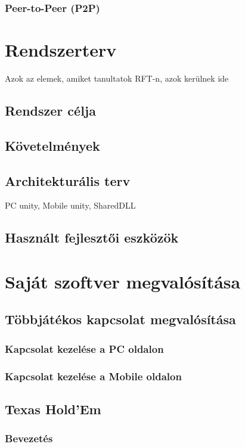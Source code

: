 \documentclass[]{thesis-ekf}
\theoremstyle{definition}
\theoremstyle{remark}
\begin{document}
\subsection{Peer-to-Peer (P2P)}

\chapter{Rendszerterv}
Azok az elemek, amiket tanultatok RFT-n, azok kerülnek ide

\section{Rendszer célja}
\section{Követelmények}
\section{Architekturális terv}
PC unity, Mobile unity, SharedDLL
\section{Használt fejlesztői eszközök}

\chapter{Saját szoftver megvalósítása}

\section{Többjátékos kapcsolat megvalósítása}

\subsection{Kapcsolat kezelése a PC oldalon}
\subsection{Kapcsolat kezelése a Mobile oldalon}

\section{Texas Hold'Em}

\subsection{Bevezetés}
\end{document}
